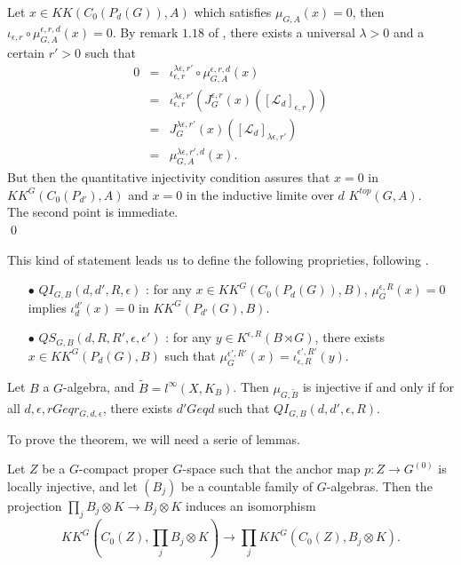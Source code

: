 \begin{dem}
Let $x\in KK(C_0(P_d(G)),A)$ which satisfies $\mu_{G,A}(x)=0$, then $\iota_{\epsilon,r}\circ\mu_{G,A}^{\epsilon,r,d}(x)=0$. By remark $1.18$ of \cite{OY2}, there exists a universal $\lambda>0$ and a certain $r'>0$ such that
\[\begin{array}{lll}0 &  =  & \iota_{\epsilon,r}^{\lambda\epsilon,r'}\circ \mu_{G,A}^{\epsilon,r,d}(x) \\
			& = & \iota_{\epsilon,r}^{\lambda\epsilon,r'} (J_{G}^{\epsilon,r}(x)([\mathcal L_d]_{\epsilon,r})) \\
			& = & J_{G}^{\lambda\epsilon,r'}(x)([\mathcal L_d]_{\lambda\epsilon,r'}) \\
			& = & \mu_{G,A}^{\lambda\epsilon,r',d}(x).
\end{array}\]
But then the quantitative injectivity condition assures that $x=0$ in $KK^G(C_0(P_{d'}),A)$ and $x=0$ in the inductive limite over $d$ $K^{top}(G,A)$.\\
The second point is immediate. \\
\qed
\end{dem}

This kind of statement leads us to define the following proprieties, following \cite{OY3}.\\
\begin{itemize}
\item[$\bullet$] $QI_{G,B}(d,d',R,\epsilon)$ : for any $x\in KK^G(C_0(P_d(G)), B )$, $\mu^{\epsilon,R}_G(x) = 0$ implies $\iota_d^{d'}(x)=0$ in $KK^G(P_{d'}(G),B)$.
\item[$\bullet$] $QS_{G,B}(d,R,R',\epsilon,\epsilon')$ : for any $y\in K^{\epsilon,R}(B\rtimes G)$, there exists $x\in KK^G(P_d(G),B)$ such that $\mu^{\epsilon',R'}_G(x)=\iota_{\epsilon,R}^{\epsilon',R'}(y)$.
\end{itemize} 

\begin{thm}\label{Quant1}
Let $B$ a $G$-algebra, and $\tilde B = l^\infty(X,K_B)$. Then $\mu_{G,\tilde B}$ is injective if and only if for all $d,\epsilon,rGeq r_{G,d,\epsilon}$, there exists $d'Geq d$ such that $QI_{G,B}(d,d',\epsilon,R)$. 
\end{thm}

To prove the theorem, we will need a serie of lemmas.\\

\begin{lem}
Let $Z$ be a $G$-compact proper $G$-space such that the anchor map $p:Z\rightarrow G^{(0)}$ is locally injective, and let $(B_j)$ be a countable family of $G$-algebras. Then the projection $\prod_j B_j \otimes K \rightarrow B_j\otimes K$ induces an isomorphism
\[KK^G(C_0(Z),\prod_j B_j\otimes K)\rightarrow\prod_j KK^G(C_0(Z),B_j\otimes K).\]
\label{LocalInjectivity}
\end{lem}

